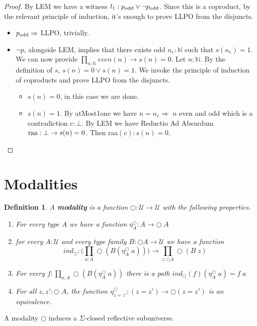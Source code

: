 \documentclass[12pt]{article}
\newtheorem{defn}[thm]{Definition}
\begin{document}
\begin{proof}
By LEM we have a witness $ l_1 :p_\textnormal{odd} \vee \neg p_\textnormal{odd}$. 
Since this is a coproduct, by the relevant principle of induction, it's enough to prove LLPO from the disjuncts. 
\begin{itemize}
	\item $p_\textnormal{odd} \Rightarrow $ LLPO, trivially.

	\item $\neg p$, alongside LEM, implies that there exists odd $n_e : \mathbb{N}$ such that $s(n_e) = 1$. 
	We can now provide $\prod_{n : \mathbb{N}} even(n) \rightarrow s(n) = 0$. 
	Let $n : \mathbb{N}$. 
	By the definition of $s$, $s(n) = 0 \vee s(n) = 1$.
	We invoke the principle of induction of coproducts and prove LLPO from the disjuncts. 
	\begin{itemize}
		\item $s(n) = 0$, in this case we are done.
		\item $s(n) = 1$. 
		By atMost1one we have $n = n_e \Rightarrow $ $n$ even and odd which is a contradiction $c : \bot$. 
		By LEM we have Reductio Ad Absurdum  $\textnormal{raa} : \bot \rightarrow s(n) = 0$. 
		Then raa$(c) : s(n) = 0$.
	\end{itemize}

\end{itemize}


\end{proof}





\section{Modalities}
\begin{defn}
A \textbf{modality} is a function $\bigcirc : \mathcal{U} \rightarrow \mathcal{U}$ with the following properties.
\begin{enumerate}
	\item For every type $A$ we have a function $\eta_A^\bigcirc : A \rightarrow \bigcirc\; A$
	\item for every $A : \mathcal{U}$ and every type family $B : \bigcirc A \rightarrow \mathcal{U}$ we have a function
	$$ind_\bigcirc : \Big( \prod_{a : A}\bigcirc (B (\eta_A^\bigcirc\; a)) \Big) \rightarrow \prod_{z : \bigcirc A} \bigcirc (B\; z)$$
	\item For every $f : \prod_{a : A} \bigcirc (B(\eta_A^\bigcirc\; a))$ there is a path $ind_\bigcirc (f)(\eta_A^\bigcirc\; a) = f\; a$
	\item For all $z,z' : \bigcirc \; A$, the function $\eta_{z=z'}^\bigcirc : (z = z') \rightarrow \bigcirc (z = z')$ is an equivalence.

\end{enumerate}
\end{defn}
A modality $\bigcirc$ induces a $\Sigma$-closed reflective subuniverse.
\end{document}
